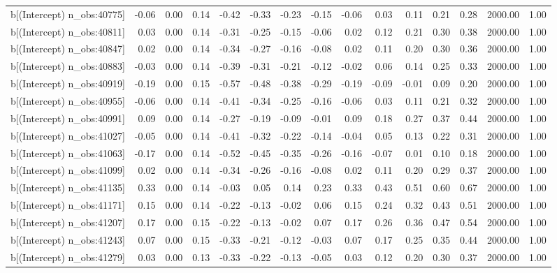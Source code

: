 \begin{table}[ht]
\begin{tabular}{rrrrrrrrrrrrrrr}
  b[(Intercept) n\_obs:40775] & -0.06 & 0.00 & 0.14 & -0.42 & -0.33 & -0.23 & -0.15 & -0.06 & 0.03 & 0.11 & 0.21 & 0.28 & 2000.00 & 1.00 \\ 
  b[(Intercept) n\_obs:40811] & 0.03 & 0.00 & 0.14 & -0.31 & -0.25 & -0.15 & -0.06 & 0.02 & 0.12 & 0.21 & 0.30 & 0.38 & 2000.00 & 1.00 \\ 
  b[(Intercept) n\_obs:40847] & 0.02 & 0.00 & 0.14 & -0.34 & -0.27 & -0.16 & -0.08 & 0.02 & 0.11 & 0.20 & 0.30 & 0.36 & 2000.00 & 1.00 \\ 
  b[(Intercept) n\_obs:40883] & -0.03 & 0.00 & 0.14 & -0.39 & -0.31 & -0.21 & -0.12 & -0.02 & 0.06 & 0.14 & 0.25 & 0.33 & 2000.00 & 1.00 \\ 
  b[(Intercept) n\_obs:40919] & -0.19 & 0.00 & 0.15 & -0.57 & -0.48 & -0.38 & -0.29 & -0.19 & -0.09 & -0.01 & 0.09 & 0.20 & 2000.00 & 1.00 \\ 
  b[(Intercept) n\_obs:40955] & -0.06 & 0.00 & 0.14 & -0.41 & -0.34 & -0.25 & -0.16 & -0.06 & 0.03 & 0.11 & 0.21 & 0.32 & 2000.00 & 1.00 \\ 
  b[(Intercept) n\_obs:40991] & 0.09 & 0.00 & 0.14 & -0.27 & -0.19 & -0.09 & -0.01 & 0.09 & 0.18 & 0.27 & 0.37 & 0.44 & 2000.00 & 1.00 \\ 
  b[(Intercept) n\_obs:41027] & -0.05 & 0.00 & 0.14 & -0.41 & -0.32 & -0.22 & -0.14 & -0.04 & 0.05 & 0.13 & 0.22 & 0.31 & 2000.00 & 1.00 \\ 
  b[(Intercept) n\_obs:41063] & -0.17 & 0.00 & 0.14 & -0.52 & -0.45 & -0.35 & -0.26 & -0.16 & -0.07 & 0.01 & 0.10 & 0.18 & 2000.00 & 1.00 \\ 
  b[(Intercept) n\_obs:41099] & 0.02 & 0.00 & 0.14 & -0.34 & -0.26 & -0.16 & -0.08 & 0.02 & 0.11 & 0.20 & 0.29 & 0.37 & 2000.00 & 1.00 \\ 
  b[(Intercept) n\_obs:41135] & 0.33 & 0.00 & 0.14 & -0.03 & 0.05 & 0.14 & 0.23 & 0.33 & 0.43 & 0.51 & 0.60 & 0.67 & 2000.00 & 1.00 \\ 
  b[(Intercept) n\_obs:41171] & 0.15 & 0.00 & 0.14 & -0.22 & -0.13 & -0.02 & 0.06 & 0.15 & 0.24 & 0.32 & 0.43 & 0.51 & 2000.00 & 1.00 \\ 
  b[(Intercept) n\_obs:41207] & 0.17 & 0.00 & 0.15 & -0.22 & -0.13 & -0.02 & 0.07 & 0.17 & 0.26 & 0.36 & 0.47 & 0.54 & 2000.00 & 1.00 \\ 
  b[(Intercept) n\_obs:41243] & 0.07 & 0.00 & 0.15 & -0.33 & -0.21 & -0.12 & -0.03 & 0.07 & 0.17 & 0.25 & 0.35 & 0.44 & 2000.00 & 1.00 \\ 
  b[(Intercept) n\_obs:41279] & 0.03 & 0.00 & 0.13 & -0.33 & -0.22 & -0.13 & -0.05 & 0.03 & 0.12 & 0.20 & 0.30 & 0.37 & 2000.00 & 1.00 \\ 

\end{tabular}
\end{table}
